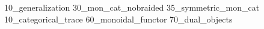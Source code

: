 
\label{chap:generalization}
{10_generalization}
{30_mon_cat_nobraided}
{35_symmetric_mon_cat}
{10_categorical_trace}
{60_monoidal_functor}
{70_dual_objects}

